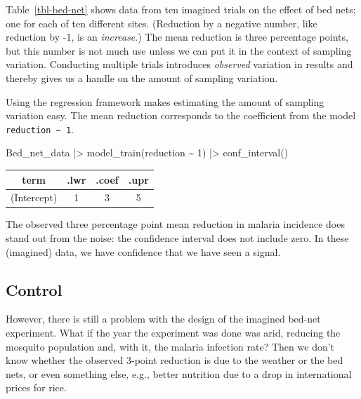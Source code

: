 \documentclass[
  letterpaper,
  DIV=11,
  numbers=noendperiod,
  oneside]{scrartcl}
\newenvironment{Shaded}{\begin{snugshade}}{\end{snugshade}}
\newcommand{\DecValTok}[1]{\textcolor[rgb]{0.68,0.00,0.00}{#1}}
\newcommand{\FunctionTok}[1]{\textcolor[rgb]{0.28,0.35,0.67}{#1}}
\newcommand{\NormalTok}[1]{\textcolor[rgb]{0.00,0.23,0.31}{#1}}
\newcommand{\SpecialCharTok}[1]{\textcolor[rgb]{0.37,0.37,0.37}{#1}}
\begin{document}
Table~\ref{tbl-bed-net} shows data from ten imagined trials on the
effect of bed nets; one for each of ten different sites. (Reduction by a
negative number, like reduction by -1, is an \emph{increase}.) The mean
reduction is three percentage points, but this number is not much use
unless we can put it in the context of sampling variation. Conducting
multiple trials introduces \emph{observed} variation in results and
thereby gives us a handle on the amount of sampling variation.

Using the regression framework makes estimating the amount of sampling
variation easy. The mean reduction corresponds to the coefficient from
the model \texttt{reduction\ \textasciitilde{}\ 1}.

\begin{Shaded}
\begin{Highlighting}[]
\NormalTok{Bed\_net\_data }\SpecialCharTok{|\textgreater{}} 
  \FunctionTok{model\_train}\NormalTok{(reduction }\SpecialCharTok{\textasciitilde{}} \DecValTok{1}\NormalTok{) }\SpecialCharTok{|\textgreater{}} 
  \FunctionTok{conf\_interval}\NormalTok{()}
\end{Highlighting}
\end{Shaded}

\begin{longtable}[]{@{}cccc@{}}
\toprule\noalign{}
term & .lwr & .coef & .upr \\
\midrule\noalign{}
\endhead
\bottomrule\noalign{}
\endlastfoot
(Intercept) & 1 & 3 & 5 \\
\end{longtable}

The observed three percentage point mean reduction in malaria incidence
does stand out from the noise: the confidence interval does not include
zero. In these (imagined) data, we have confidence that we have seen a
signal.

\subsection{Control}\label{control}

However, there is still a problem with the design of the imagined
bed-net experiment. What if the year the experiment was done was arid,
reducing the mosquito population and, with it, the malaria infection
rate? Then we don't know whether the observed 3-point reduction is due
to the weather or the bed nets, or even something else, e.g., better
nutrition due to a drop in international prices for rice.
\end{document}
